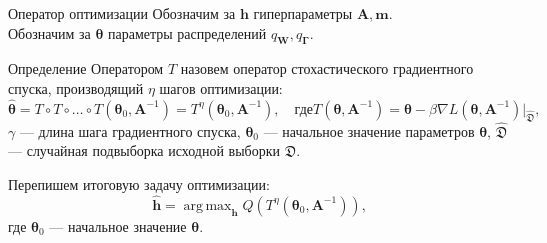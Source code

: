 \documentclass[usenames,dvipsnames,11pt,pdf,utf8,russian,aspectratio=169]{beamer}
\DeclareMathOperator*{\argmax}{arg\,max}
\begin{document}
\begin{frame}{Оператор оптимизации}
\small
Обозначим за $\mathbf{h}$ гиперпараметры $\mathbf{A}, \mathbf{m}$.\\
Обозначим за $\boldsymbol{\theta}$ параметры распределений $q_{\mathbf{W}}, q_{\boldsymbol{\Gamma}}$.

\begin{block}{Определение}
Оператором $T$ назовем оператор стохастического градиентного спуска, производящий $\eta$ шагов оптимизации:
\[
	 \hat{\boldsymbol{\theta}} = T \circ T \circ \dots \circ T(\boldsymbol{\theta}_0, \mathbf{A}^{-1}) = T^\eta(\boldsymbol{\theta}_0, \mathbf{A}^{-1}), \quad\text{где}	T(\boldsymbol{\theta}, \mathbf{A}^{-1}) =\boldsymbol{\theta} - \beta \nabla L(\boldsymbol{\theta}, \mathbf{A}^{-1})|_{\hat{\mathfrak{D}}}, 
\]
$\gamma$ --- длина шага градиентного спуска, $\boldsymbol{\theta}_0$ --- начальное значение параметров $\boldsymbol{\theta}$, $\hat{\mathfrak{D}}$ --- случайная подвыборка исходной выборки $\mathfrak{D}$.
\end{block}

Перепишем итоговую задачу оптимизации:
\[
	\hat{\mathbf{h}} = \argmax_{\mathbf{h}} Q\left( T^\eta(\boldsymbol{\theta}_0, \mathbf{A}^{-1})\right),
\]
где $\boldsymbol{\theta}_0$ --- начальное значение $\boldsymbol{\theta}$.



\end{frame}

\end{document}
